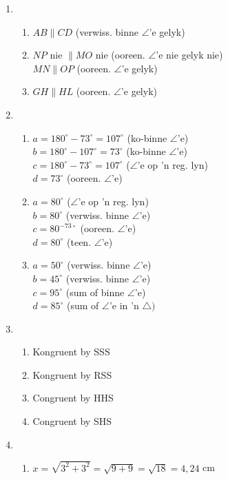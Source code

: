 \begin{eocsolutions}{}
{\begin{enumerate}[itemsep=5pt, label=\textbf{\arabic*}. ]
\item %
	  \begin{enumerate}[noitemsep, label=\textbf{(\alph*)} ]
		\item $AB \parallel CD$ (verwiss. binne $\angle$'e gelyk)
		\item $NP$ nie $\parallel MO$ nie (ooreen. $\angle$'e nie gelyk nie)\\
$MN \parallel OP$ (ooreen. $\angle$'e gelyk)
		\item $GH \parallel HL$ (ooreen. $\angle$'e gelyk)
	  \end{enumerate}
\item 
\begin{enumerate}[noitemsep, label=\textbf{(\alph*)} ]
		\item $a=180^{\circ} -73^{\circ}=107^{\circ}$ (ko-binne $\angle$'e)\\
$ b=180^{\circ} -107^{\circ}=73^{\circ}$ (ko-binne $\angle$'e)\\

 $c=180^{\circ} -73^{\circ}=107^{\circ}$ ($\angle$'e op 'n reg. lyn)\\
$d=73^{\circ}$ (ooreen. $\angle$'e)
\item $a=80^{\circ}$ ($\angle$'e op 'n reg. lyn)\\
 $b=80^{\circ}$ (verwiss. binne $\angle$'e)\\
 $c=80^{-73\circ}$ (ooreen. $\angle$'e)\\
 $d=80^{\circ}$ (teen. $\angle$'e)
\item $a=50^{\circ}$ (verwiss. binne $\angle$'e)\\
 $ b=45^{\circ}$ (verwiss. binne $\angle$'e)\\
 $c=95^{\circ}$ (sum of binne $\angle$'e)\\
 $ d=85^{\circ}$ (sum of $\angle$'e in 'n $\triangle)$
	  \end{enumerate}
\item 
  \begin{enumerate}[noitemsep, label=\textbf{(\alph*)} ]
		\item Kongruent by SSS%
		\item Kongruent by RSS%
		\item  Congruent by HHS%
		\item Congruent by SHS
	  \end{enumerate}

\item 	  \begin{enumerate}[noitemsep, label=\textbf{(\alph*)} ]
	\item $x=\sqrt{3^2+3^2} = \sqrt{9+9} =\sqrt{18} =4,24$ cm%


\end{enumerate}
\end{enumerate}}
\end{eocsolutions}
